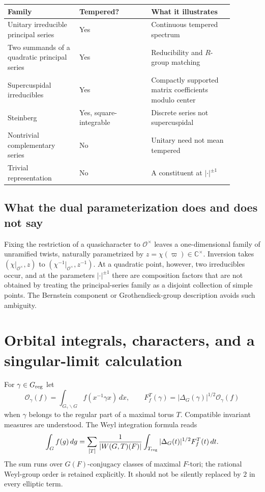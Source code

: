 \documentclass[12pt,letterpaper]{amsart}
\numberwithin{equation}{section}
\theoremstyle{definition}
\theoremstyle{remark}
\begin{document}
\begin{center}\small
\begin{tabular}{@{}p{0.28\linewidth}p{0.28\linewidth}p{0.32\linewidth}@{}}\toprule
Family & Tempered? & What it illustrates \\\midrule
Unitary irreducible principal series & Yes & Continuous tempered spectrum \\
Two summands of a quadratic principal series & Yes & Reducibility and $R$-group matching \\
Supercuspidal irreducibles & Yes & Compactly supported matrix coefficients modulo center \\
Steinberg & Yes, square-integrable & Discrete series not supercuspidal \\
Nontrivial complementary series & No & Unitary need not mean tempered \\
Trivial representation & No & A constituent at $|\cdot|^{\pm1}$ \\\bottomrule
\end{tabular}
\end{center}

\subsection{What the dual parameterization does and does not say}
Fixing the restriction of a quasicharacter to $\mathcal O^\times$ leaves a one-dimensional family of unramified twists, naturally parametrized by $z=\chi(\varpi)\in\mathbb C^\times$.  Inversion takes $(\chi|_{\mathcal O^\times},z)$ to $(\chi^{-1}|_{\mathcal O^\times},z^{-1})$. At a quadratic point, however, two irreducibles occur, and at the parameters $|\cdot|^{\pm1}$ there are composition factors that are not obtained by treating the principal-series family as a disjoint collection of simple points. The Bernstein component or Grothendieck-group description avoids such ambiguity.

\section{Orbital integrals, characters, and a singular-limit calculation}\label{sec:orbital}
For $\gamma\in G_{\rm reg}$ let
\[
\mathcal O_\gamma(f)=\int_{G_\gamma\backslash G} f(x^{-1}\gamma x)\,d\dot x,
\qquad
F_f^T(\gamma)=|\Delta_G(\gamma)|^{1/2}\mathcal O_\gamma(f)
\]
when $\gamma$ belongs to the regular part of a maximal torus $T$.  Compatible invariant measures are understood.  The Weyl integration formula reads
\begin{equation}\label{eq:weyl}
\int_G f(g)\,dg=\sum_{[T]}\frac{1}{|W(G,T)(F)|}
\int_{T_{\rm reg}} |\Delta_G(t)|^{1/2}F_f^T(t)\,dt.
\end{equation}
The sum runs over $G(F)$-conjugacy classes of maximal $F$-tori; the rational Weyl-group order is retained explicitly.  It should not be silently replaced by $2$ in every elliptic term.
\end{document}
